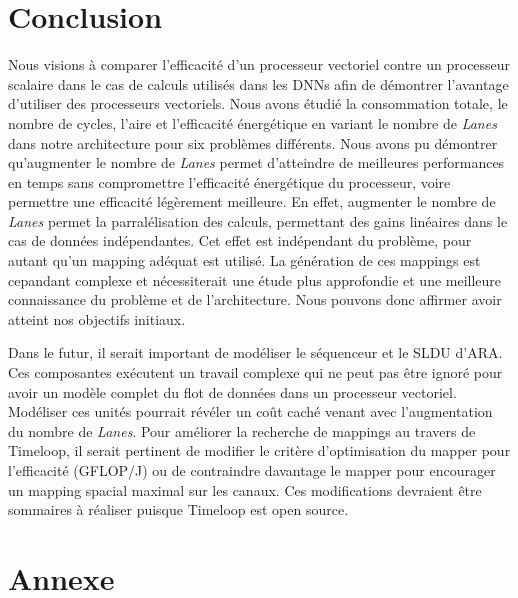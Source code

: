 \documentclass[11pt,letterpaper]{article}
\begin{document}
\section{Conclusion}
\begin{multicols}{2}

    Nous visions à comparer l'efficacité d'un processeur vectoriel contre un processeur 
    scalaire dans le cas de calculs utilisés dans les DNNs afin de démontrer l'avantage 
    d'utiliser des processeurs vectoriels. Nous avons étudié la consommation totale, le 
    nombre de cycles, l'aire et l'efficacité énergétique en variant le nombre de \textit{Lanes} 
    dans notre architecture pour six problèmes différents. Nous avons pu démontrer 
    qu'augmenter le nombre de \textit{Lanes} permet d'atteindre de meilleures performances 
    en temps sans compromettre l'efficacité énergétique du processeur, voire permettre une 
    efficacité légèrement meilleure. En effet, augmenter le nombre de \textit{Lanes} permet 
    la parralélisation des calculs, permettant des gains linéaires dans le cas de données 
    indépendantes. Cet effet est indépendant du problème, pour autant qu'un mapping adéquat 
    est utilisé. La génération de ces mappings est cepandant complexe et nécessiterait une 
    étude plus approfondie et une meilleure connaissance du problème et de l'architecture.
    Nous pouvons donc affirmer avoir atteint nos objectifs initiaux.

    Dans le futur, il serait important de modéliser le séquenceur et le SLDU d'ARA. Ces 
    composantes exécutent un travail complexe qui ne peut pas être ignoré pour avoir un 
    modèle complet du flot de données dans un processeur vectoriel. Modéliser ces unités 
    pourrait révéler un coût caché venant avec l'augmentation du nombre de \textit{Lanes}.
    Pour améliorer la recherche de mappings au travers de Timeloop, il serait pertinent 
    de modifier le critère d'optimisation du mapper pour l'efficacité (GFLOP/J) ou de contraindre
    davantage le mapper pour encourager un mapping spacial maximal sur les canaux. Ces 
    modifications devraient être sommaires à réaliser puisque Timeloop est open source.
    
    \end{multicols}

{}
    

\pagebreak
\section*{Annexe}
\end{document}
